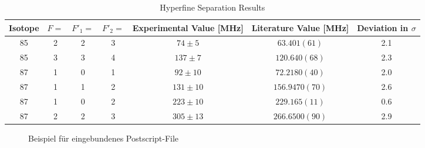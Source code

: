 \documentclass[12pt, a4paper]{article}
\begin{document}
\begin{table}[htb]
\begin{center}
\caption{Hyperfine Separation Results\protect\footnotemark}
\vspace{4mm}
\begin{tabular}{|c|c|c|c|c|c|c|}\hline
Isotope     & $F =$  & $F'_1 =$   & $F'_2 =$   & Experimental Value [MHz]   & Literature Value [MHz]     & Deviation in $\sigma$ \\\hline
85          & 2      & 2          & 3          & $74 \pm 5$                 & $63.401(61)$               & 2.1\\
85          & 3      & 3          & 4          & $137 \pm 7$                & $120.640(68)$              & 2.3\\
87          & 1      & 0          & 1          & $92 \pm 10$                & $72.2180(40)$              & 2.0\\
87          & 1      & 1          & 2          & $131 \pm 10$               & $156.9470(70)$             & 2.6\\
87          & 1      & 0          & 2          & $223 \pm 10$               & $229.165(11)$              & 0.6\\
87          & 2      & 2          & 3          & $305 \pm 13$               & $266.6500(90)$             & 2.9\\\hline
\end{tabular}

\end{center}
\end{table}



\newpage






















\begin{figure}[h]
  \centering
  \caption{Beispiel f\"ur eingebundenes Postscript-File}
  \label{ps}
\end{figure}
\end{document}
